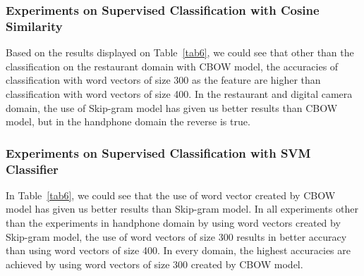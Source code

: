 \documentclass[a4paper,conference]{IEEEtran}
\begin{document}
\subsubsection{Experiments on Supervised Classification with Cosine Similarity}
Based on the results displayed on Table~\ref{tab6}, we could see that other than the classification on the restaurant domain with CBOW model, the accuracies of classification with word vectors of size 300 as the feature are higher than classification with word vectors of size 400. In the restaurant and digital camera domain, the use of Skip-gram model has given us better results than CBOW model, but in the handphone domain the reverse is true. 

\subsubsection{Experiments on Supervised Classification with SVM Classifier}
In Table~\ref{tab6}, we could see that the use of word vector created by CBOW model has given us better results than Skip-gram model. In all experiments other than the experiments in handphone domain by using word vectors created by Skip-gram model, the use of word vectors of size 300 results in better accuracy than using word vectors of size 400. In every domain, the highest accuracies are achieved by using word vectors of size 300 created by CBOW model.
\end{document}
